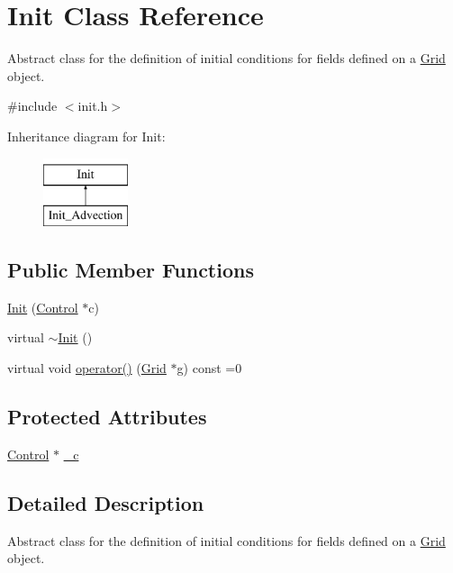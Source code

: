 \hypertarget{class_init}{}\section{Init Class Reference}
\label{class_init}


Abstract class for the definition of initial conditions for fields defined on a \hyperlink{class_grid}{Grid} object.  




{\ttfamily \#include $<$init.\+h$>$}

Inheritance diagram for Init\+:\begin{figure}[H]
\begin{center}
\leavevmode
\includegraphics[height=2.000000cm]{class_init}
\end{center}
\end{figure}
\subsection*{Public Member Functions}
\begin{DoxyCompactItemize}
\item 
\hyperlink{class_init_aaf14d36f1120460e411f35b54a3bd385}{Init} (\hyperlink{class_control}{Control} $\ast$c)
\item 
virtual \hyperlink{class_init_adf301c6b7bfd8c50032fe2cfef0b102e}{$\sim$\+Init} ()
\item 
virtual void \hyperlink{class_init_a1deef07e59de84489cbf7a10d2e737d2}{operator()} (\hyperlink{class_grid}{Grid} $\ast$g) const =0
\end{DoxyCompactItemize}
\subsection*{Protected Attributes}
\begin{DoxyCompactItemize}
\item 
\hyperlink{class_control}{Control} $\ast$ \hyperlink{class_init_a0e16042aa3fadf50ccf598d0d255cd36}{\+\_\+c}
\end{DoxyCompactItemize}


\subsection{Detailed Description}
Abstract class for the definition of initial conditions for fields defined on a \hyperlink{class_grid}{Grid} object. 


